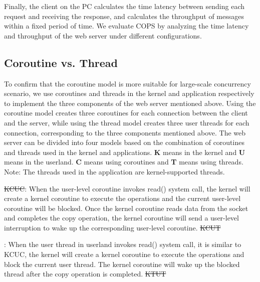 \documentclass[sigconf,review,anonymous]{acmart}
\providecommand{\DIFadd}[1]{{\protect\color{blue}\uwave{#1}}} %
\providecommand{\DIFdel}[1]{{\protect\color{red}\sout{#1}}}                      %
\providecommand{\DIFaddbegin}{} %
\providecommand{\DIFaddend}{} %
\providecommand{\DIFdelbegin}{} %
\providecommand{\DIFdelend}{} %
\begin{document}
Finally, the client on the PC calculates the time latency between sending each request and receiving the response, and calculates the throughput of messages within a fixed period of time. We evaluate COPS by analyzing the time latency and throughput of the web server under different configurations.

\subsection{Coroutine vs. Thread}

To confirm that the coroutine model is more suitable for large-scale concurrency scenario, we use coroutines and threads in the kernel and application respectively to implement the three components of the web server mentioned above. Using the coroutine model creates three coroutines for each connection between the client and the server, while using the thread model creates three user threads for each connection, corresponding to the three components mentioned above. The web server can be divided into four models based on the combination of coroutines and threads used in the kernel and applications. \textbf{K} means in the kernel and \textbf{U} means in the userland. \textbf{C} means using coroutines and \textbf{T} means using threads. Note: The threads used in the application are kernel-supported threads. 

\DIFdelbegin %
\DIFdel{KCUC}\DIFdelend \DIFaddbegin \textbf{\DIFadd{KCUC}}\DIFaddend : When the user-level coroutine invokes read() system call, the kernel will create a kernel coroutine to execute the operations and the current user-level coroutine will be blocked. Once the kernel coroutine reads data from the socket and completes the copy operation, the kernel coroutine will send a user-level interruption to wake up the corresponding user-level coroutine.
	\DIFdelbegin %
\DIFdel{KCUT}\DIFdelend \DIFaddbegin 

\textbf{\DIFadd{KCUT}}\DIFaddend : When the user thread in userland invokes read() system call, it is similar to KCUC, the kernel will create a kernel coroutine to execute the operations and block the current user thread. The kernel coroutine will wake up the blocked thread after the copy operation is completed.
	\DIFdelbegin %
\DIFdel{KTUT}\DIFdelend \DIFaddbegin 
\end{document}
